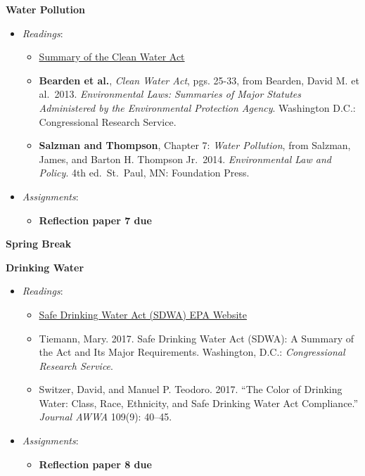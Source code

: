 \week \textbf{Water Pollution}

\begin{itemize}

\item
  \emph{Readings}:

  \begin{itemize}
  
  \item
    \href{https://www.epa.gov/laws-regulations/summary-clean-water-act}{Summary
    of the Clean Water Act}
  \item
    \textbf{Bearden et al.}, \emph{Clean Water Act}, pgs. 25-33, from
    Bearden, David M. et al.~2013. \emph{Environmental Laws: Summaries
    of Major Statutes Administered by the Environmental Protection
    Agency}. Washington D.C.: Congressional Research Service.
  \item
    \textbf{Salzman and Thompson}, Chapter 7: \emph{Water Pollution},
    from Salzman, James, and Barton H. Thompson Jr.~2014.
    \emph{Environmental Law and Policy}. 4th ed.~St.~Paul, MN:
    Foundation Press.
  \end{itemize}
\item
  \emph{Assignments}:

  \begin{itemize}
  
  \item
    \textbf{‌Reflection paper 7 due}
  \end{itemize}
\end{itemize}

\week \textbf{Spring Break}

\week \textbf{Drinking Water}

\begin{itemize}

\item
  \emph{Readings}:

  \begin{itemize}
  
  \item
    \href{https://www.epa.gov/sdwa}{Safe Drinking Water Act (SDWA) EPA
    Website}
  \item
    Tiemann, Mary. 2017. Safe Drinking Water Act (SDWA): A Summary of
    the Act and Its Major Requirements. Washington, D.C.:
    \emph{Congressional Research Service}.
  \item
    Switzer, David, and Manuel P. Teodoro. 2017. ``The Color of Drinking
    Water: Class, Race, Ethnicity, and Safe Drinking Water Act
    Compliance.'' \emph{Journal AWWA} 109(9): 40--45.
  \end{itemize}
\item
  \emph{Assignments}:

  \begin{itemize}
  
  \item
    \textbf{‌Reflection paper 8 due}
  \end{itemize}
\end{itemize}

